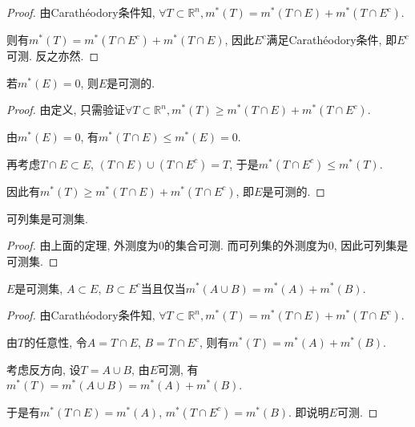 \documentclass[theorem=false,mathfont=none,openany,sub3section]{easybook}
\begin{document}
\begin{proof}
  由Carathéodory条件知, $\forall T\subset \mathbb{R}^n, m^{*}(T)=m^{*}(T\cap E)+m^{*}(T\cap E^c)$.\par
  则有$m^{*}(T)=m^{*}(T\cap E^c)+m^{*}(T\cap E)$, 因此$E^c$满足Carathéodory条件, 即$E^c$可测. 反之亦然.\par
\end{proof}

\begin{theorem}
  若$m^{*}(E)=0$, 则$E$是可测的.\par
\end{theorem}

\begin{proof}
  由定义, 只需验证$\forall T\subset \mathbb{R}^n, m^{*}(T)\geqslant m^{*}(T\cap E)+m^{*}(T\cap E^c)$.\par
  由$m^{*}(E)=0$, 有$m^{*}(T\cap E)\leqslant m^{*}(E)=0$.\par
  再考虑$T\cap E\subset E$, $(T\cap E)\cup (T\cap E^c)=T$, 于是$m^{*}(T\cap E^c)\leqslant m^{*}(T)$.\par
  因此有$m^{*}(T)\geqslant m^{*}(T\cap E)+m^{*}(T\cap E^c)$, 即$E$是可测的.\par
\end{proof}

\begin{corollary}
  可列集是可测集.\par
\end{corollary}

\begin{proof}
  由上面的定理, 外测度为0的集合可测. 而可列集的外测度为0, 因此可列集是可测集.\par
\end{proof}

\begin{theorem}
  $E$是可测集, $A\subset E$, $B\subset E^c$当且仅当$m^{*}(A\cup B)=m^{*}(A)+m^{*}(B)$.\par
\end{theorem}

\begin{proof}
  由Carathéodory条件知, $\forall T\subset \mathbb{R}^n, m^{*}(T)=m^{*}(T\cap E)+m^{*}(T\cap E^c)$.\par
  由$T$的任意性, 令$A=T\cap E$, $B=T\cap E^c$, 则有$m^{*}(T)=m^{*}(A)+m^{*}(B)$.\par
  考虑反方向, 设$T=A\cup B$, 由$E$可测, 有$m^{*}(T)=m^{*}(A\cup B)=m^{*}(A)+m^{*}(B)$.\par
  于是有$m^{*}(T\cap E)=m^{*}(A)$, $m^{*}(T\cap E^c)=m^{*}(B)$. 即说明$E$可测.\par
\end{proof}
\end{document}
